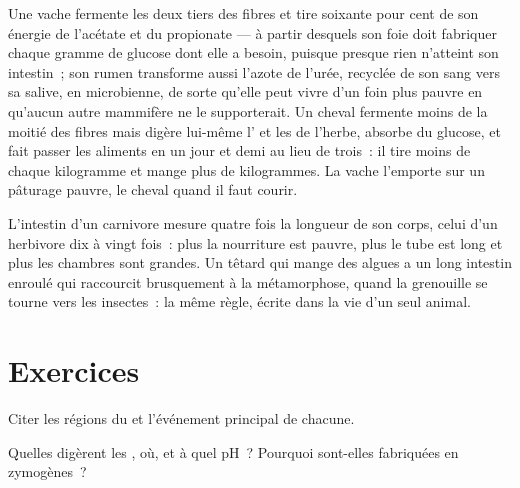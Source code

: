 \begin{example}\label{ex:b1:digestion-absorption:cowhorse}
Une vache fermente les deux tiers des fibres et tire soixante pour cent
de son énergie de l'acétate et du propionate --- à partir desquels son
foie doit fabriquer chaque gramme de glucose dont elle a besoin,
puisque presque rien n'atteint son intestin~; son rumen transforme aussi
l'azote de l'urée, recyclée de son sang vers sa salive, en 
microbienne, de sorte qu'elle peut vivre d'un foin plus pauvre en
 qu'aucun autre mammifère ne le supporterait. Un cheval
fermente moins de la moitié des fibres mais digère lui-même l' et
les  de l'herbe, absorbe du glucose, et fait passer les
aliments en un jour et demi au lieu de trois~: il tire moins de chaque
kilogramme et mange plus de kilogrammes. La vache l'emporte sur un
pâturage pauvre, le cheval quand il faut courir.
\end{example}

\begin{remark}\label{rem:b1:digestion-absorption:length}
L'intestin d'un carnivore mesure quatre fois la longueur de son corps,
celui d'un herbivore dix à vingt fois~: plus la nourriture est pauvre,
plus le tube est long et plus les chambres sont grandes. Un têtard qui
mange des algues a un long intestin enroulé qui raccourcit brusquement
à la métamorphose, quand la grenouille se tourne vers les insectes~:
la même règle, écrite dans la vie d'un seul animal.
\end{remark}

\section{Exercices}

\begin{exercise}[$\star$]\label{exo:b1:digestion-absorption:1}
Citer les régions du  et l'événement principal de chacune.
\end{exercise}

\begin{exercise}[$\star$]\label{exo:b1:digestion-absorption:2}
Quelles  digèrent les , où, et à quel pH~? Pourquoi
sont-elles fabriquées en zymogènes~?
\end{exercise}

